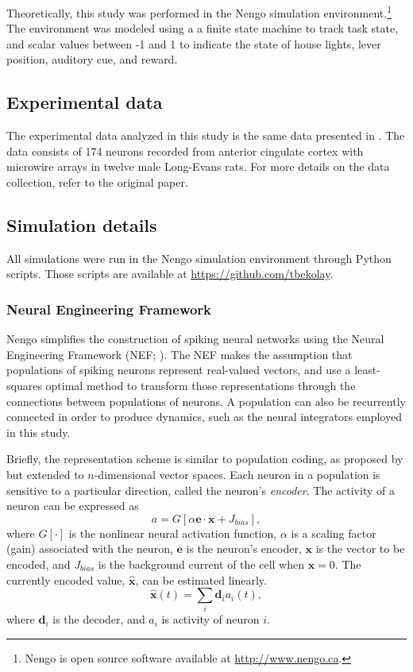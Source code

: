 \documentclass[11pt]{article}
\begin{document}
Theoretically, this study was performed
in the Nengo simulation environment.\footnote{Nengo is open source
  software available at \url{http://www.nengo.ca}.}
The environment was modeled using a
a finite state machine to track task state,
and scalar values between -1 and 1
to indicate the state of
house lights, lever position, auditory cue, and reward.

\subsection{Experimental data}

The experimental data analyzed in this study
is the same data presented in
\citet{Narayanan2009}.
The data consists of 174 neurons
recorded from anterior cingulate cortex with microwire arrays
in twelve male Long-Evans rats.
For more details on the data collection,
refer to the original paper.

\subsection{Simulation details}

All simulations were run
in the Nengo simulation environment
through Python scripts.
Those scripts are available
at \url{https://github.com/tbekolay}.

\subsubsection{Neural Engineering Framework} \label{sec:nef}

Nengo simplifies the construction
of spiking neural networks
using the Neural Engineering Framework (NEF; \citealp{Eliasmith2003}).
The NEF makes the assumption
that populations of spiking neurons
represent real-valued vectors,
and use a least-squares optimal method
to transform those representations
through the connections between
populations of neurons.
A population can also be recurrently connected
in order to produce dynamics,
such as the neural integrators
employed in this study.

Briefly, the representation scheme
is similar to population coding,
as proposed by \citet{Georgopoulos1986}
but extended to $n$-dimensional vector spaces.
Each neuron in a population is sensitive
to a particular direction,
called the neuron's \textit{encoder}.
The activity of a neuron can be expressed as
\begin{equation}
	a = G[\alpha \mathbf{e} \cdot \mathbf{x} + J_{bias}],
\end{equation}
where $G[\cdot]$ is the nonlinear neural activation function,
$\alpha$ is a scaling factor (gain) associated with the neuron,
$\mathbf{e}$ is the neuron's encoder,
$\mathbf{x}$ is the vector to be encoded, and
$J_{bias}$ is the background current of the cell
when $\mathbf{x} = 0$.
The currently encoded value, $\mathbf{\hat{x}}$,
can be estimated linearly.
\begin{equation}
  \mathbf{\hat{x}}(t) = \sum_i \mathbf{d}_i a_i(t),
\end{equation}
where $\mathbf{d}_i$ is the decoder,
and $a_i$ is activity of neuron $i$.
\end{document}
